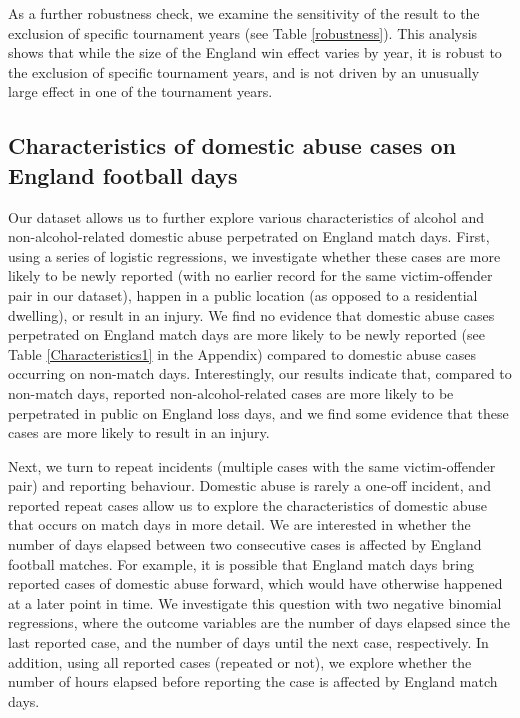 \documentclass[12pt, a4paper]{article}
\begin{document}
  As a further robustness check, we examine the sensitivity of the result to the exclusion of specific tournament years  (see Table \ref{robustness}). This analysis shows that while the size of the England win effect varies by year, it is robust to the exclusion of specific tournament years, and is not driven by an unusually large effect in one of the tournament years.


\subsection{Characteristics of domestic abuse cases on England football days}

Our dataset allows us to further explore various characteristics of alcohol and non-alcohol-related domestic abuse perpetrated on England match days. First, using a series of logistic regressions, we investigate whether these cases are more likely to be newly reported (with no earlier record for the same victim-offender pair in our dataset), happen in a public location (as opposed to a residential dwelling), or result in an injury. We find no evidence that domestic abuse cases perpetrated on England match days are more likely to be newly reported (see Table \ref{Characteristics1} in the Appendix) compared to domestic abuse cases occurring on non-match days. Interestingly, our results indicate that, compared to non-match days, reported non-alcohol-related cases are more likely to be perpetrated in public on England loss days, and we find some evidence that these cases are more likely to result in an injury. 

Next, we turn to repeat incidents (multiple cases with the same victim-offender pair) and reporting behaviour. Domestic abuse is rarely a one-off incident, and reported repeat cases allow us to explore the characteristics of domestic abuse that occurs on match days in more detail. We are interested in whether the number of days elapsed between two consecutive cases is affected by England football matches. For example, it is possible that England match days bring reported cases of domestic abuse forward, which would have otherwise happened at a later point in time. We investigate this question with two negative binomial regressions, where the outcome variables are the number of days elapsed since the last reported case, and the number of days until the next case, respectively. In addition, using all reported cases (repeated or not), we explore whether the number of hours elapsed before reporting the case is affected by England match days.
\end{document}
